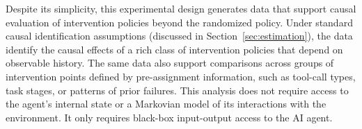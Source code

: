 Despite its simplicity, this experimental design generates data that support causal evaluation of intervention policies beyond the randomized policy.
Under standard causal identification assumptions (discussed in Section~\ref{sec:estimation}), the data identify the causal effects of a rich class of intervention policies that depend on observable history.
The same data also support comparisons across groups of intervention points defined by pre-assignment information, such as tool-call types, task stages, or patterns of prior failures.
This analysis does not require access to the agent's internal state or a Markovian model of its interactions with the environment. It only requires black-box input-output access to the AI agent.

